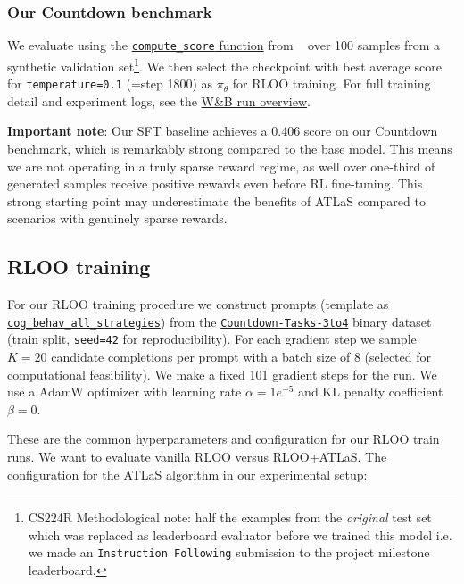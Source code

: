 \documentclass{article}
\begin{document}
\subsubsection{Our Countdown benchmark}

We evaluate using the \href{https://github.com/kanishkg/cognitive-behaviors/blob/9c90d333c6e3b5eafe801cb4cadd5ee973cc8291/verl/utils/reward_score/countdown.py#L59}{\texttt{compute\_score} function} from ~\cite{gandhi2025cognitive} over 100 samples from a synthetic validation set\footnote{CS224R Methodological note: half the examples from the \textit{original} test set which was replaced as leaderboard evaluator before we trained this model i.e. we made an \texttt{Instruction Following} submission to the project milestone leaderboard.}. We then select the checkpoint with best average score for \texttt{temperature=0.1} (=step 1800) as $\pi_{\theta}$ for RLOO training. For full training detail and experiment logs, see the \href{https://wandb.ai/jonathanalgar/cs224r-project-sft-baseline/runs/d6osiygw/overview}{W\&B run overview}.

\textbf{Important note}: Our SFT baseline achieves a 0.406 score on our Countdown benchmark, which is remarkably strong compared to the base model. This means we are not operating in a truly sparse reward regime, as well over one-third of generated samples receive positive rewards even before RL fine-tuning. This strong starting point may underestimate the benefits of ATLaS compared to scenarios with genuinely sparse rewards.

\subsection{RLOO training}

For our RLOO training procedure we construct prompts (template as \texttt{\href{https://huggingface.co/datasets/Asap7772/cog_behav_all_strategies}{cog\_behav\_all\_strategies}}) from the \texttt{\href{https://huggingface.co/datasets/Jiayi-Pan/Countdown-Tasks-3to4}{Countdown-Tasks-3to4}} binary dataset (train split, \texttt{seed=42} for reproducibility). For each gradient step we sample $K=20$ candidate completions per prompt with a batch size of 8 (selected for computational feasibility). We make a fixed 101 gradient steps for the run. We use a AdamW optimizer with learning rate $\alpha = 1e^{-5}$ and KL penalty coefficient $\beta = 0$.

These are the common hyperparameters and configuration for our RLOO train runs. We want to evaluate vanilla RLOO versus RLOO+ATLaS. The configuration for the ATLaS algorithm in our experimental setup:
\end{document}
